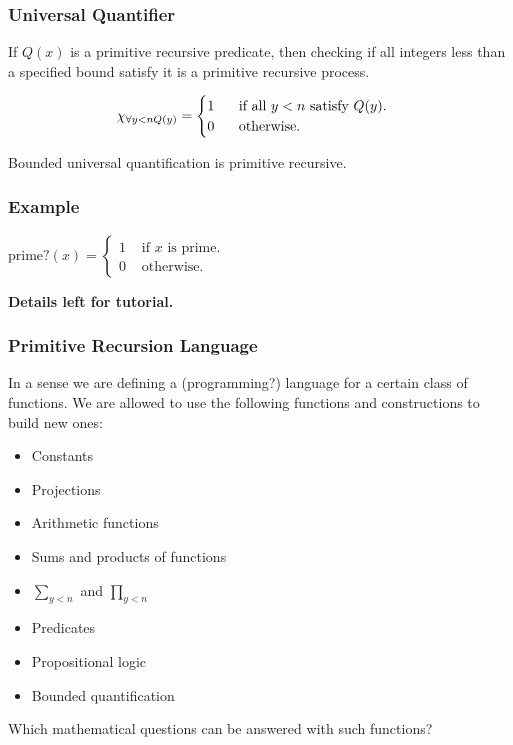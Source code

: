 \documentclass{beamer}
\begin{document}
\begin{frame}
	\frametitle{Universal Quantifier}

	If $Q(x)$ is a primitive recursive predicate, then checking if all integers less than a specified bound satisfy it is a primitive recursive process. 

	$$\chi_{\forall y < n Q(y)} =  \begin{cases}
		1 \hspace{0.5cm} \text{ if all } y < n \text{ satisfy } Q(y).\\
		0 \hspace{0.5cm} \text{ otherwise.}
	\end{cases}   $$

	\vspace{0.5cm}

	Bounded universal quantification is primitive recursive.

	\vspace{3cm}


\end{frame}

\begin{frame}
	\frametitle{Example}

	 $\text{prime?}(x) = \begin{cases}
		1 & \text{ if } x \text{ is prime.} \\
		0 & \text{ otherwise.}
	 \end{cases}$
	
	\vspace{6cm}

	\hspace{6cm} {\bf Details left for tutorial.}

\end{frame}

\begin{frame}
	\frametitle{Primitive Recursion Language}

	In a sense we are defining a (programming?) language for a certain class of functions. We are allowed to use the following functions and constructions to build new ones: 

	\vspace{0.5cm}

	\begin{itemize}
		\item[] Constants
		\item[] Projections 
		\item[] Arithmetic functions 
		\item[] Sums and products of functions
		\item[] $\sum_{y<n}$ and $\prod_{y<n}$
		\item[] Predicates 
		\item[] Propositional logic 
		\item[] Bounded quantification
	\end{itemize}

	\vspace{0.5cm}

	Which mathematical questions can be answered with such functions? 

\end{frame}
\end{document}

